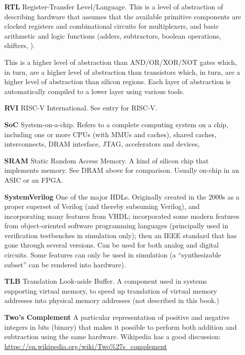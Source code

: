 \begin{itemize}
\item[\bf RTL] Register-Transfer Level/Language.  This is a level of
  abstraction of describing hardware that assumes that the available
  primitive components are clocked registers and combinational
  circuits for multiplexers, and basic arithmetic and logic functions
  (adders, subtractors, boolean operations, shifters, {\etc}).

  This is a higher level of abstraction than AND/OR/XOR/NOT gates
  which, in turn, are a higher level of abstraction than transistors
  which, in turn, are a higher level of abstraction than silicon
  regions.  Each layer of abstraction is automatically compiled to a
  lower layer using various tools.

\item[\bf RVI] RISC-V International.  See entry for RISC-V.

\item[\bf SoC] System-on-a-chip.  Refers to a complete computing
  system on a chip, including one or more CPUs (with MMUs and caches),
  shared caches, interconnects, DRAM interface, JTAG, accelerators and
  devices, {\etc}

\item[\bf SRAM] Static Random Access Memory.  A kind of silicon chip
  that implements memory.  See DRAM above for comparison.  Usually
  on-chip in an ASIC or an FPGA.

\item[\bf SystemVerilog] One of the major HDLs.  Originally created in
  the 2000s as a proper superset of Verilog (and thereby subsuming
  Verilog), and incorporating many features from VHDL; incorporated
  some modern features from object-oriented software programming
  languages (principally used in verification testbenches in
  simulation only); then an IEEE standard that has gone through
  several versions.  Can be used for both analog and digital circuits.
  Some features can only be used in simulation (a ``synthesizable
  subset'' can be rendered into hardware).

\item[\bf TLB] Translation Look-aside Buffer.  A component used in
  systems supporting virtual memory, to speed up translation of
  virtual memory addresses into physical memory addresses (not
  described in this book.)

\item[\bf Two's Complement] A particular representation of positive
  and negative integers in bits (binary) that makes it possible to
  perform both addition and subtraction using the same
  hardware. Wikipedia has a good discussion:
  \url{https://en.wikipedia.org/wiki/Two%27s_complement}



\end{itemize}
